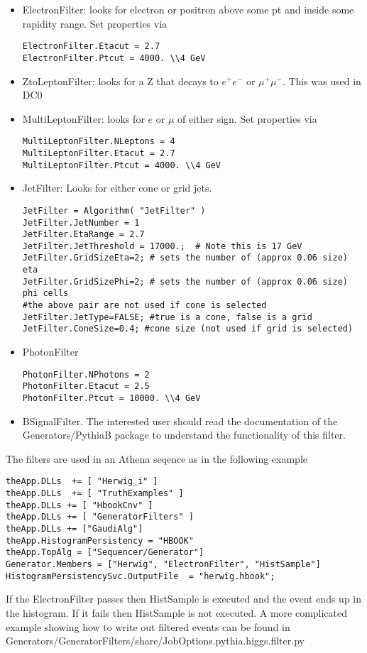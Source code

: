 \documentclass[11pt]{article}
\begin{document}
\begin{itemize}
\item ElectronFilter: looks for electron or positron above some pt and
inside some rapidity range. Set properties via
\begin{verbatim}
ElectronFilter.Etacut = 2.7
ElectronFilter.Ptcut = 4000. \\4 GeV
\end{verbatim}
\item ZtoLeptonFilter: looks for a Z that decays to $e^+e^-$ or
  $\mu^+\mu^-$. This was used in DC0
\item MultiLeptonFilter: looks for $e$ or $\mu$ of either sign. 
 Set properties via
\begin{verbatim}
MultiLeptonFilter.NLeptons = 4
MultiLeptonFilter.Etacut = 2.7
MultiLeptonFilter.Ptcut = 4000. \\4 GeV
\end{verbatim}
\item JetFilter: Looks for either cone or grid jets.
\begin{verbatim}
JetFilter = Algorithm( "JetFilter" )
JetFilter.JetNumber = 1
JetFilter.EtaRange = 2.7
JetFilter.JetThreshold = 17000.;  # Note this is 17 GeV
JetFilter.GridSizeEta=2; # sets the number of (approx 0.06 size) eta
JetFilter.GridSizePhi=2; # sets the number of (approx 0.06 size) phi cells
#the above pair are not used if cone is selected
JetFilter.JetType=FALSE; #true is a cone, false is a grid
JetFilter.ConeSize=0.4; #cone size (not used if grid is selected)
\end{verbatim}
\item PhotonFilter
\begin{verbatim}
PhotonFilter.NPhotons = 2
PhotonFilter.Etacut = 2.5
PhotonFilter.Ptcut = 10000. \\4 GeV
\end{verbatim}
\item BSignalFilter. The interested user should read the documentation of the Generators/PythiaB
  package to understand the functionality of this filter.
\end{itemize}


The filters are used in an Athena seqence as in the following example
\begin{verbatim}
theApp.DLLs  += [ "Herwig_i" ]
theApp.DLLs  += [ "TruthExamples" ]
theApp.DLLs += [ "HbookCnv" ]
theApp.DLLs += [ "GeneratorFilters" ]
theApp.DLLs += ["GaudiAlg"]
theApp.HistogramPersistency = "HBOOK"
theApp.TopAlg = ["Sequencer/Generator"]
Generator.Members = ["Herwig", "ElectronFilter", "HistSample"]
HistogramPersistencySvc.OutputFile  = "herwig.hbook";
\end{verbatim}
If the ElectronFilter passes then HistSample is executed and the event
ends up in the histogram. If it fails then HistSample is not
executed. A more complicated example showing how to write out
filtered events can be found in
Generators/GeneratorFilters/share/JobOptions.pythia.higgs.filter.py
\end{document}
